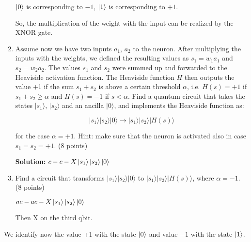 \documentclass[12pt]{article}
\begin{document}
\begin{enumerate}
          $\ket{0}$ is corresponding to $-1$, $\ket{1}$ is corresponding to $+1$.

          So, the multiplication of the weight with the input can be realized by the XNOR gate.



    \item Assume now we have two inputs $a_1$, $a_2$ to the neuron. After multiplying the inputs with the weights, we defined the resulting values as $s_1 = w_1a_1$ and $s_2 = w_2a_2$. The values $s_1$ and $s_2$ were summed up and forwarded to the Heaviside activation function. The Heaviside function $H$ then outputs the value +1 if the sum $s_1 + s_2$ is above a certain threshold $\alpha$, i.e. $H(s) = +1$ if $s_1 + s_2 \geq \alpha$ and $H(s) = -1$ if $s < \alpha$. Find a quantum circuit that takes the states $|s_1\rangle$, $|s_2\rangle$ and an ancilla $|0\rangle$, and implements the Heaviside function as:

          \begin{equation}
              |s_1\rangle|s_2\rangle|0\rangle \rightarrow |s_1\rangle|s_2\rangle|H(s)\rangle
          \end{equation}

          for the case $\alpha = +1$. Hint: make sure that the neuron is activated also in case $s_1 = s_2 = +1$. (8 points)

          \textbf{Solution:}
          $c-c-X\ket{s_1}\ket{s_2}\ket{0}$

    \item Find a circuit that transforms $|s_1\rangle|s_2\rangle|0\rangle$ to $|s_1\rangle|s_2\rangle|H(s)\rangle$, where $\alpha = -1$. (8 points)
          
          $ac-ac-X\ket{s_1}\ket{s_2}\ket{0}$

          Then X on the third qbit.
\end{enumerate}
We identify now the value +1 with the state $\ket{0}$ and value $-1$ with the state $\ket{1}$.
\end{document}
